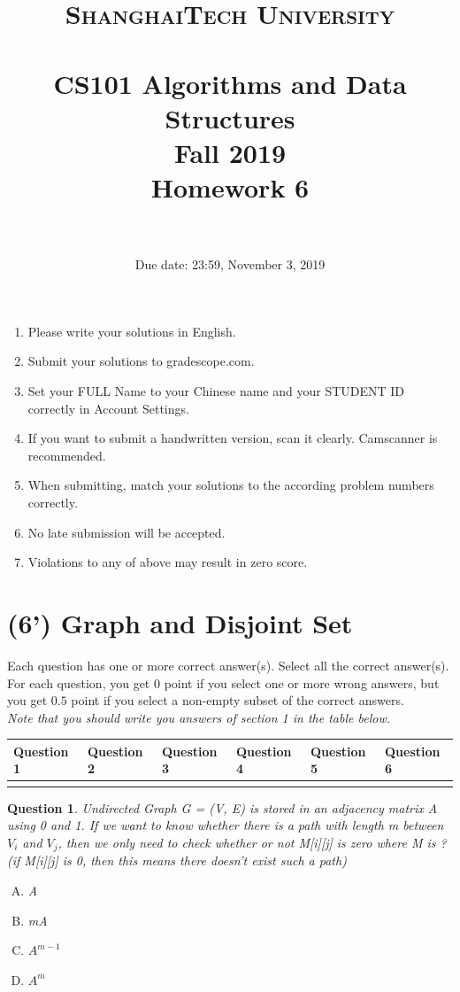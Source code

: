 \documentclass{article}
\title{
    \normalfont \normalsize
    \textsc{ShanghaiTech University} \\ [25pt]
    \horrule{0.5pt} \\[0.4cm] %
    \huge CS101 Algorithms and Data Structures\\ %
    \LARGE Fall 2019\\
    \LARGE Homework 6\\
    \horrule{2pt} \\[0.5cm] %
}
\author{}
\date{Due date: 23:59, November 3, 2019}
\newtheorem{Q}{Question}
\begin{document}
\maketitle
\thispagestyle{firstpage}
\vspace{3ex}

\begin{enumerate}
\item Please write your solutions in English. 

\item Submit your solutions to gradescope.com.  

\item Set your FULL Name to your Chinese name and your STUDENT ID correctly in Account Settings. 

\item If you want to submit a handwritten version, scan it clearly. Camscanner is recommended. 

\item When submitting, match your solutions to the according problem numbers correctly. 

\item No late submission will be accepted.

\item Violations to any of above may result in zero score. 
\end{enumerate}
\newpage

\section{(6') Graph and Disjoint Set}
Each question has one or more correct answer(s). Select all the correct answer(s). For each question, you get $0$ point if you select one or more wrong answers, but you get $0.5$ point if you select a non-empty subset of the correct answers.\\
\textit{Note that you should write you answers of section 1 in the table below.}
\begin{table}[htbp]
	\begin{tabular}{|p{2cm}|p{2cm}|p{2cm}|p{2cm}|p{2cm}|p{2cm}|}
		\hline 
		Question 1 & Question 2 & Question 3 & Question 4 & Question 5 & Question 6 \\ 
		\hline 
		&  &  &  &  &\\ 
		\hline 
	\end{tabular} 
\end{table}
\begin{Q}
Undirected Graph G = (V, E) is stored in an adjacency matrix A using 0 and 1. If we want to know whether there is a path with length m between $V_i$ and $V_j$, then we only need to check whether or not M[i][j] is zero where M is ? (if M[i][j] is 0, then this means there doesn't exist such a path)  
\begin{enumerate}[(A)]
	\item A
	\item mA
	\item $A^{m-1}$
	\item $A^m$
\end{enumerate}
\end{Q}
\end{document}
